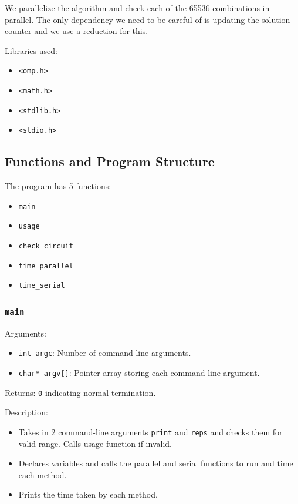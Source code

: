 \documentclass{article}
\begin{document}
\medskip
\noindent
We parallelize the algorithm and check each of the 65536 combinations in parallel. The only dependency we need to be careful of is updating the solution counter and we use a reduction for this.

\medskip
\noindent
Libraries used:
\begin{itemize}
	\item \texttt{<omp.h>}
    \item \texttt{<math.h>}
    \item \texttt{<stdlib.h>}
    \item \texttt{<stdio.h>}
\end{itemize}

\subsection{Functions and Program Structure}
The program has 5 functions:
\begin{itemize}
    \item \texttt{main}
    \item \texttt{usage}
    \item \texttt{check\_circuit}
    \item \texttt{time\_parallel}
    \item \texttt{time\_serial}
\end{itemize}

\subsubsection{\texttt{main}}
Arguments: 
    \begin{itemize}
	    \item \texttt{int argc}: Number of command-line arguments.
        \item \texttt{char* argv[]}: Pointer array storing each command-line argument. 
    \end{itemize}
Returns: \texttt{0} indicating normal termination.

\medskip
\noindent
Description: 
\begin{itemize}
    \item Takes in 2 command-line arguments \texttt{print} and \texttt{reps} and checks them for valid range. Calls usage function if invalid.

    \item Declares variables and calls the parallel and serial functions to run and time each method.

    \item Prints the time taken by each method.
\end{itemize}
\end{document}

